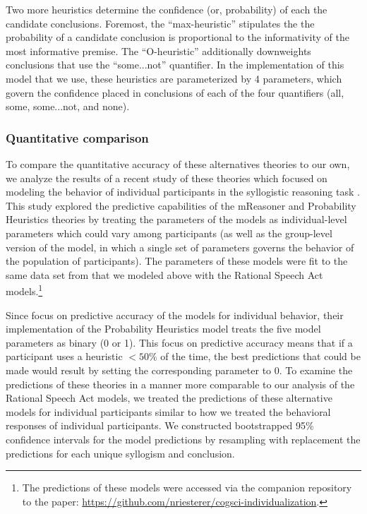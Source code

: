 \documentclass[floatsintext, doc]{apa6}
\begin{document}
Two more heuristics determine the confidence (or, probability) of each the candidate conclusions. 
Foremost, the ``max-heuristic'' stipulates the the probability of a candidate conclusion is proportional to the informativity of the most informative premise.
The ``O-heuristic'' additionally downweights conclusions that use the ``some...not'' quantifier.
In the implementation of this model that we use, these heuristics are parameterized by 4 parameters, which govern the confidence placed in conclusions of each of the four quantifiers (all, some, some...not, and none).

\subsubsection{Quantitative comparison}

To compare the quantitative accuracy of these alternatives theories to our own, we analyze the results of a recent study of these theories which focused on modeling the behavior of individual participants in the syllogistic reasoning task \cite{riesterer2020models}.
This study explored the predictive capabilities of the mReasoner and Probability Heuristics theories by treating the parameters of the models as individual-level parameters which could vary among participants (as well as the group-level version of the model, in which a single set of parameters governs the behavior of the population of participants).
The parameters of these models were fit to the same data set from  that we modeled above with the Rational Speech Act models.\footnote{The predictions of these models were accessed via the companion repository to the paper: \url{https://github.com/nriesterer/cogsci-individualization}.}

Since  focus on predictive accuracy of the models for individual behavior, their implementation of the Probability Heuristics model treats the five model parameters as binary (0 or 1). This focus on predictive accuracy means that if a participant uses a heuristic $<50\%$ of the time, the best predictions that could be made would result by setting the corresponding parameter to 0. 
To examine the predictions of these theories in a manner more comparable to our analysis of the Rational Speech Act models, we treated the predictions of these alternative models for individual participants similar to how we treated the behavioral responses of individual participants. 
We constructed bootstrapped 95\% confidence intervals for the model predictions by resampling with replacement the predictions for each unique syllogism and conclusion. 
\end{document}
